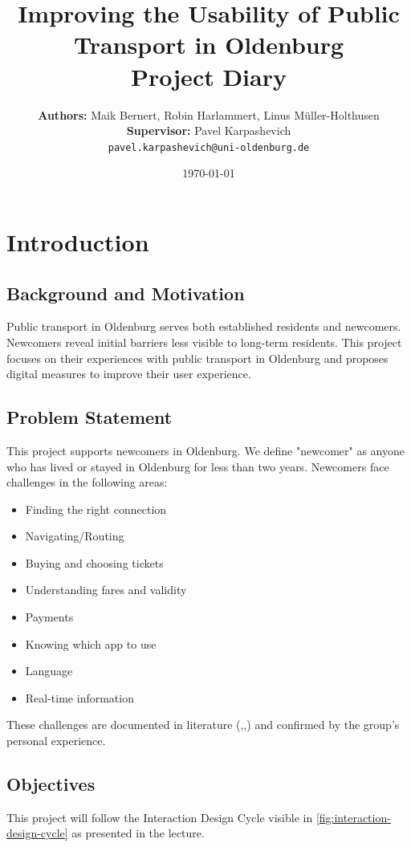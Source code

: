 \documentclass[12pt,a4paper]{article}
\title{\textbf{Improving the Usability of Public Transport in Oldenburg}\\
\vspace{0.5cm}
\large Project Diary}
\author{
    \textbf{Authors:} Maik Bernert, Robin Harlammert, Linus Müller-Holthusen \\
    \textbf{Supervisor:} Pavel Karpashevich \\
    \texttt{pavel.karpashevich@uni-oldenburg.de}
}
\date{\today}
\begin{document}
\maketitle
\newpage
{}

\tableofcontents
\listoffigures
\listoftables
\newpage
{}

\section{Introduction}
\subsection{Background and Motivation}
Public transport in Oldenburg serves both established residents and newcomers. Newcomers reveal initial barriers less visible to long-term residents. This project focuses on their experiences with public transport in Oldenburg and proposes digital measures to improve their user experience.

\subsection{Problem Statement}
This project supports newcomers in Oldenburg. We define "newcomer" as anyone who has lived or stayed in Oldenburg for less than two years. Newcomers face challenges in the following areas:

\begin{itemize}
    \item Finding the right connection
    \item Navigating/Routing
    \item Buying and choosing tickets
    \item Understanding fares and validity
    \item Payments
    \item Knowing which app to use
    \item Language
    \item Real-time information
\end{itemize}

These challenges are documented in literature (\cite{usability},\cite{DZIEKAN2007489},\cite{mindthegap}) and confirmed by the group's personal experience.

\subsection{Objectives}
This project will follow the Interaction Design Cycle visible in \autoref{fig:interaction-design-cycle} as presented in the lecture.
\end{document}
